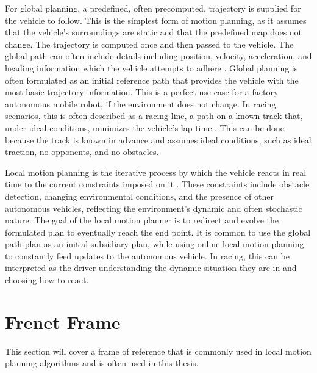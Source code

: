 For global planning, a predefined, often precomputed, trajectory is supplied for the vehicle to follow.
This is the simplest form of motion planning, as it assumes that the vehicle's surroundings are static and that the predefined map does not change.
The trajectory is computed once and then passed to the vehicle.
The global path can often include details including position, velocity, acceleration, and heading information which the vehicle attempts to adhere \cite{heilmeier_MinimumCurvatureTrajectory_2020}.
Global planning is often formulated as an initial reference path that provides the vehicle with the most basic trajectory information.
This is a perfect use case for a factory autonomous mobile robot, if the environment does not change.
In racing scenarios, this is often described as a racing line, a path on a known track that, under ideal conditions, minimizes the vehicle's lap time \cite{heilmeier_MinimumCurvatureTrajectory_2020, liniger_OptimizationBasedAutonomousRacing_2017}.
This can be done because the track is known in advance and assumes ideal conditions, such as ideal traction, no opponents, and no obstacles.

Local motion planning is the iterative process by which the vehicle reacts in real time to the current constraints imposed on it \cite{gonzalez_ReviewMotionPlanning_2016, werling_OptimalTrajectoryGeneration_2010}.
These constraints include obstacle detection, changing environmental conditions, and the presence of other autonomous vehicles, reflecting the environment's dynamic and often stochastic nature.
The goal of the local motion planner is to redirect and evolve the formulated plan to eventually reach the end point.
It is common to use the global path plan as an initial subsidiary plan, while using online local motion planning to constantly feed updates to the autonomous vehicle.
In racing, this can be interpreted as the driver understanding the dynamic situation they are in and choosing how to react.

\section{Frenet Frame}
\label{section:FrenetFrame}

This section will cover a frame of reference that is commonly used in local motion planning algorithms and is often used in this thesis.

